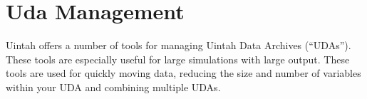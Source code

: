 


\chapter{Uda Management } \label{Chapter:UDA}
Uintah offers a number of tools for managing Uintah Data Archives (``UDAs''). These tools are especially useful for large simulations with large output.  These tools are used for quickly moving data, reducing the size and number of variables within your UDA and combining multiple UDAs. 

\iffalse
